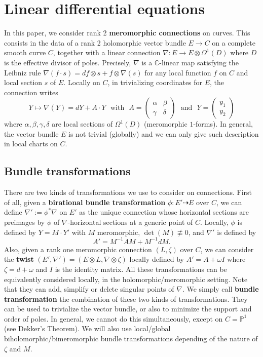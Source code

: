 \documentclass[12]{amsart}
\begin{document}
\section{Linear differential equations}\label{sec:DiffEq}

In this paper, we consider rank 2 {\bf meromorphic connections} on curves.
This consists in the data of a rank 2 holomorphic vector bundle $E\to C$ on a complete smooth curve $C$,
together with a linear connection $\nabla:E\to E\otimes\Omega^1(D)$ where $D$ is the effective divisor of poles.
Precisely, $\nabla$ is a $\mathbb C$-linear map satisfying the Leibniz
rule $\nabla(f\cdot s)=df\otimes s+f\otimes\nabla(s)$ for any local function $f$ on $C$ and local section $s$ of $E$.
Locally on $C$, in trivializing coordinates for $E$, the connection writes
\begin{equation}\label{eq:generalsystem}
Y\mapsto\nabla(Y)=dY+A\cdot Y\ \ \ \text{with}\ \ \ A=\begin{pmatrix}\alpha&\beta\\ \gamma&\delta\end{pmatrix}
\ \ \ \text{and}\ \ \ Y=\begin{pmatrix}y_1\\ y_2\end{pmatrix}
\end{equation}
where $\alpha,\beta,\gamma,\delta$ are local sections of $\Omega^1(D)$ (meromorphic $1$-forms).
In general, the vector bundle $E$ is not trivial (globally) and we can only give such description in local charts on $C$.


\subsection{Bundle transformations}
There are two kinds of transformations we use to consider on connections. First of all, given a {\bf birational bundle transformation}
$\phi:E'\dashrightarrow E$ over $C$, we can define $\nabla':=\phi^*\nabla$ on $E'$ as the unique connection whose
horizontal sections are preimages by $\phi$ of $\nabla$-horizontal sections at a generic point of $C$.
Locally, $\phi$ is defined by $Y=M\cdot Y'$ with $M$ meromorphic, $\det(M)\not\equiv0$, and $\nabla'$
is defined by 
\begin{equation}\label{eq:gauge}
A'=M^{-1}AM+M^{-1}dM.
\end{equation}
Also, given a rank one meromorphic connection $(L,\zeta)$ over $C$, we can consider the {\bf twist}
$(E',\nabla')=(E\otimes L,\nabla\otimes\zeta)$ locally defined by $A'=A+\omega I$ where $\zeta=d+\omega$ 
and $I$ is the identity matrix. 
All these transformations can be equivalently considered locally, in the holomorphic/meromorphic setting.
Note that they can add, simplify or delete singular points of $\nabla$.
We simply call {\bf bundle transformation} the combination of these two kinds of transformations.
They can be used to trivialize the vector bundle, or also to minimize the support and order of poles.
In general, we cannot do this simultaneously, except on $C=\mathbb P^1$ (see Dekker's Theorem).
We will also use local/global biholomorphic/bimeromorphic bundle transformations depending
of the nature of $\zeta$ and $M$.
\end{document}
